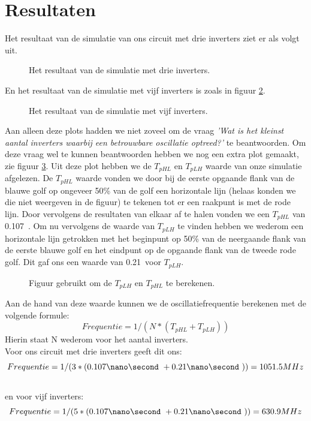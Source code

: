 \documentclass{scrartcl}  %
\begin{document}
\section{Resultaten}
Het resultaat van de simulatie van ons circuit met drie inverters ziet er als volgt uit.
\begin{figure}[H]
\centering
		\setlength{} 
		\setlength{}
		
		\caption{Het resultaat van de simulatie met drie inverters.}
		\label{fig:meetdrie}
\end{figure}
En het resultaat van de simulatie met vijf inverters is zoals in figuur \ref{fig:meetvijf}.
\begin{figure}[H]
\centering
		\setlength{} 
		\setlength{}
		
		\caption{Het resultaat van de simulatie met vijf inverters.}
		\label{fig:meetvijf}
\end{figure}
Aan alleen deze plots hadden we niet zoveel om de vraag {\it 'Wat is het kleinst aantal inverters waarbij een betrouwbare oscillatie optreed?'} te beantwoorden. Om deze vraag wel te kunnen beantwoorden hebben we nog een extra plot gemaakt, zie figuur \ref{fig:tplhtphl5}. Uit deze plot hebben we de $T_{pHL}$ en $T_{pLH}$ waarde van onze simulatie afgelezen. De $T_{pHL}$ waarde vonden we door bij de eerste opgaande flank van de blauwe golf op ongeveer 50\% van de golf een horizontale lijn (helaas konden we die niet weergeven in de figuur) te tekenen tot er een raakpunt is met de rode lijn. Door vervolgens de resultaten van elkaar af te halen vonden we een $T_{pHL}$ van 0.107\nano\second\ . Om nu vervolgens de waarde van $T_{pLH}$ te vinden hebben we wederom een horizontale lijn getrokken met het beginpunt op 50\% van de neergaande flank van de eerste blauwe golf en het eindpunt op de opgaande flank van de tweede rode golf. Dit gaf ons een waarde van 0.21\nano\second\ voor $T_{pLH}$.

\begin{figure}[H]
\centering
		\setlength{} 
		\setlength{}
		
		\caption{Figuur gebruikt om de $T_{pLH}$ en $T_{pHL}$ te berekenen.}
		\label{fig:tplhtphl5}
\end{figure}
Aan de hand van deze waarde kunnen we de oscillatiefrequentie berekenen met de volgende formule: 
\begin{equation}
Frequentie = 1/(N*(T_{pHL}+T_{pLH}))
\end{equation}
Hierin staat N wederom voor het aantal inverters. 
\\Voor ons circuit met drie inverters geeft dit ons: 
\begin{equation}
Frequentie = 1/(3*(0.107\nano\second\ + 0.21\nano\second\ )) = 1051.5 MHz
\end{equation} 
\\en voor vijf inverters:
\begin{equation}
Frequentie = 1/(5*(0.107\nano\second\ + 0.21\nano\second\ )) = 630.9 MHz
\end{equation} 
\end{document}
